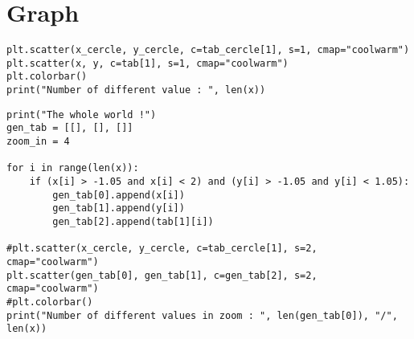 \section{Graph}

\begin{lstlisting}
plt.scatter(x_cercle, y_cercle, c=tab_cercle[1], s=1, cmap="coolwarm")
plt.scatter(x, y, c=tab[1], s=1, cmap="coolwarm")
plt.colorbar()
print("Number of different value : ", len(x))
\end{lstlisting}

\begin{lstlisting}
print("The whole world !")
gen_tab = [[], [], []]
zoom_in = 4

for i in range(len(x)):
    if (x[i] > -1.05 and x[i] < 2) and (y[i] > -1.05 and y[i] < 1.05):
        gen_tab[0].append(x[i])
        gen_tab[1].append(y[i])
        gen_tab[2].append(tab[1][i])

#plt.scatter(x_cercle, y_cercle, c=tab_cercle[1], s=2, cmap="coolwarm")
plt.scatter(gen_tab[0], gen_tab[1], c=gen_tab[2], s=2, cmap="coolwarm")
#plt.colorbar()
print("Number of different values in zoom : ", len(gen_tab[0]), "/", len(x))
\end{lstlisting}





